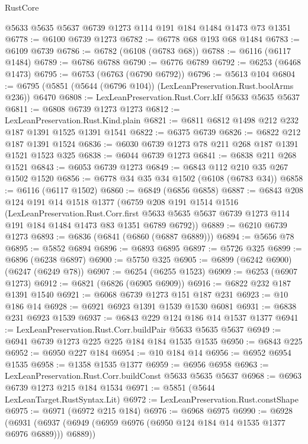 \begin{lexlean}{RustCore}
\begin{coremodule}
    @5633
    @5635
    @5637
    @6739
    @1273
    @114
    @191
    @184
    @1484
    @1473
    @73
    @1351
@6778 := @6100 @6739 @1273
@6782 := @6778 @68 @193 @68 @1484
@6783 := @6109 @6739
@6786 := @6782 (@6108 (@6783 @68))
@6788 := @6116 (@6117 @1484)
@6789 := @6786 @6788
@6790 := @6776 @6789
@6792 := @6253 (@6468 @1473)
@6795 := @6753 (@6763 (@6790 @6792))
@6796 := @5613 @104
@6804 := @6795 (@5851 (@5644 (@6796 @104)) (LexLeanPreservation.Rust.boolArms @236)) @6470
@6808 := LexLeanPreservation.Rust.Corr.kIf @5633 @5635 @5637
@6811 := @6808 @6739 @1273 @1273
@6812 := LexLeanPreservation.Rust.Kind.plain
@6821 := @6811 @6812 @1498 @212 @232 @187 @1391 @1525 @1391 @1541
@6822 := @6375 @6739
@6826 := @6822 @212 @187 @1391 @1524
@6836 := @6030 @6739 @1273 @78 @211 @268 @187 @1391 @1521 @1523 @325
@6838 := @6044 @6739 @1273
@6841 := @6838 @211 @268 @1521
@6843 := @6053 @6739 @1273
@6849 := @6843 @112 @210 @35 @267 @1502 @1520
@6856 := @6778 @34 @35 @34 @1502 (@6108 (@6783 @34))
@6858 := @6116 (@6117 @1502)
@6860 := @6849 (@6856 @6858)
@6887 := @6843
    @208
    @124
    @191
    @14
    @1518
    @1377
    (@6759
      @208
      @191
      @1514
      @1516
      (LexLeanPreservation.Rust.Corr.first
        @5633
        @5635
        @5637
        @6739
        @1273
        @114
        @191
        @184
        @1484
        @1473
        @83
        @1351
        @6789
        @6792))
@6889 := @6210 @6739 @1273
@6893 := @6836 (@6841 (@6860 (@6887 @6889)))
@6894 := @5656 @78
@6895 := @5852 @6894
@6896 := @6893 @6895
@6897 := @5726 @325
@6899 := @6896 (@6238 @6897)
@6900 := @5750 @325
@6905 := @6899 (@6242 @6900) (@6247 (@6249 @78))
@6907 := @6254 (@6255 @1523)
@6909 := @6253 (@6907 @1273)
@6912 := @6821 (@6826 (@6905 @6909))
@6916 := @6822 @232 @187 @1391 @1540
@6921 := @6068 @6739 @1273 @151 @187 @231
@6923 := @10 @186 @14
@6928 := @6921 @6923 @1391 @1539 @1530 @6081
@6931 := @6838 @231 @6923 @1539
@6937 := @6843 @229 @124 @186 @14 @1537 @1377
@6941 := LexLeanPreservation.Rust.Corr.buildPair @5633 @5635 @5637
@6949 := @6941 @6739 @1273 @225 @225 @184 @184 @1535 @1535
@6950 := @6843 @225
@6952 := @6950 @227 @184
@6954 := @10 @184 @14
@6956 := @6952 @6954 @1535
@6958 := @1358 @1535 @1377
@6959 := @6956 @6958
@6963 := LexLeanPreservation.Rust.Corr.buildConst @5633 @5635 @5637
@6968 := @6963 @6739 @1273 @215 @184 @1534
@6971 := @5851 (@5644 LexLeanTarget.RustSyntax.Lit)
@6972 := LexLeanPreservation.Rust.constShape
@6975 := @6971 (@6972 @215 @184)
@6976 := @6968 @6975
@6990 := @6928
    (@6931 (@6937 (@6949 (@6959 @6976 (@6950 @124 @184 @14 @1535 @1377 @6976 @6889))) @6889))

\end{coremodule}
\end{lexlean}
